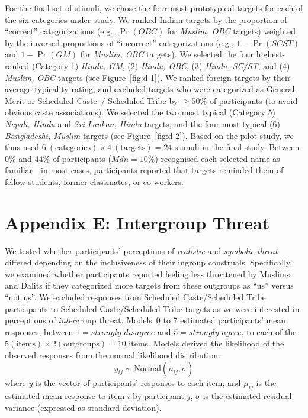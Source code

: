 \documentclass[12pt, a4paper]{article}
\begin{document}
For the final set of stimuli, we chose the four most prototypical targets for each of the six categories under study. We ranked Indian targets by the proportion of ``correct'' categorizations (e.g., $\Pr(\textit{OBC})$ for \emph{Muslim, OBC} targets) weighted by the inversed proportions of ``incorrect'' categorizations (e.g., $1 - \Pr(\textit{SCST})$ and $1 - \Pr(\textit{GM})$ for \emph{Muslim, OBC} targets). We selected the four highest-ranked (Category 1) \emph{Hindu, GM}, (2) \emph{Hindu, OBC}, (3) \emph{Hindu, SC/ST}, and (4) \emph{Muslim, OBC} targets (see Figure~\ref{fig:d-1}). We ranked foreign targets by their average typicality rating, and excluded targets who were categorized as General Merit or Scheduled Caste~/ Scheduled Tribe by $\ge 50\%$ of participants (to avoid obvious caste associations). We selected the two most typical (Category 5) \emph{Nepali, Hindu} and \emph{Sri Lankan, Hindu} targets, and the four most typical (6) \emph{Bangladeshi, Muslim} targets (see Figure~\ref{fig:d-2}). Based on the pilot study, we thus used $6~(\text{categories}) \times 4~(\text{targets}) = 24$ stimuli in the final study. Between $0\%$ and $44\%$ of participants ($\textit{Mdn} = 10\%$) recognised each selected name as familiar---in most cases, participants reported that targets reminded them of fellow students, former classmates, or co-workers.

\newpage

\section{Appendix E: Intergroup Threat}

We tested whether participants' perceptions of \emph{realistic} and \emph{symbolic threat} differed depending on the inclusiveness of their ingroup construals. Specifically, we examined whether participants reported feeling less threatened by Muslims and Dalits if they categorized more targets from these outgroups as ``us'' versus ``not us''. We excluded responses from Scheduled Caste/Scheduled Tribe participants to Scheduled Caste/Scheduled Tribe targets as we were interested in perceptions of \emph{inter}group threat. Models~0 to 7 estimated participants' mean responses, between $1 = \textit{strongly disagree}$ and $5 = \textit{strongly agree}$, to each of the $ 5 (\text{items}) \times 2 (\text{outgroups}) = 10$ items. Models derived the likelihood of the observed responses from the normal likelihood distribution: $$ y_{ij} \sim \text{Normal} (\mu_{ij}, \sigma) $$ where $y$ is the vector of participants' responses to each item, and $\mu_{ij}$ is the estimated mean response to item $i$ by participant $j$, $\sigma$ is the estimated residual variance (expressed as standard deviation).
\end{document}
